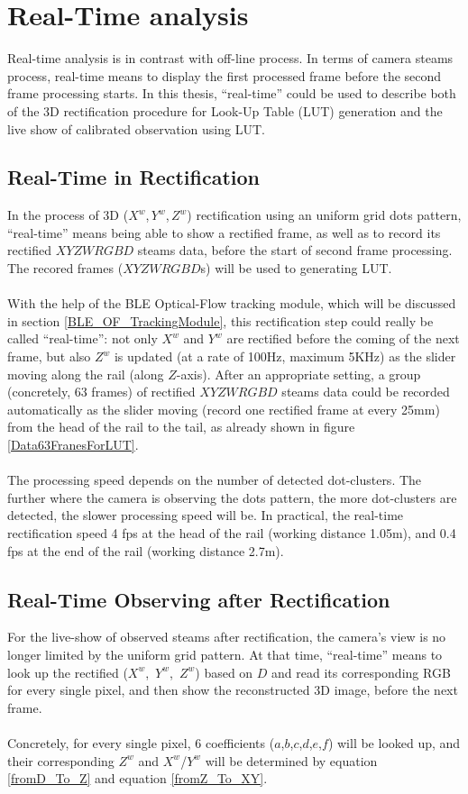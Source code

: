 \section{Real-Time analysis}
Real-time analysis is in contrast with off-line process. In terms of camera steams process, real-time means to display the first processed frame before the second frame processing starts. In this thesis, \enquote{real-time} could be used to describe both of the 3D rectification procedure for Look-Up Table (LUT) generation and the live show of calibrated observation using LUT.
\subsection{Real-Time in Rectification}
In the process of 3D (\(X^{w}\),\,\(Y^{w}\),\,\(Z^{w}\)) rectification using an uniform grid dots pattern, \enquote{real-time} means being able to show a rectified frame, as well as to record its rectified \(XYZWRGBD\) steams data, before the start of second frame processing. The recored frames (\(XYZWRGBD\)s) will be used to generating LUT.%
\\\\%
With the help of the BLE Optical-Flow tracking module, which will be discussed in section \ref{BLE_OF_TrackingModule}, this rectification step could really be called \enquote{real-time}: not only \(X^{w}\) and \(Y^{w}\) are rectified before the coming of the next frame, but also \(Z^{w}\) is updated (at a rate of 100Hz, maximum 5KHz) as the slider moving along the rail (along \(Z\)-axis). After an appropriate setting, a group (concretely, 63 frames) of rectified \(XYZWRGBD\) steams data could be recorded automatically as the slider moving (record one rectified frame at every 25mm) from the head of the rail to the tail, as already shown in figure \ref{Data63FranesForLUT}.%
\\\\%
The processing speed depends on the number of detected dot-clusters. The further where the camera is observing the dots pattern, the more dot-clusters are detected, the slower processing speed will be. In practical, the real-time rectification speed 4 fps at the head of the rail (working distance 1.05m), and 0.4 fps at the end of the rail (working distance 2.7m).
%
\subsection{Real-Time Observing after Rectification}
%
For the live-show of observed steams after rectification, the camera's view is no longer limited by the uniform grid pattern. At that time, \enquote{real-time} means to look up the rectified (\(X^{w}\),\, \(Y^{w}\),\, \(Z^{w}\)) based on \(D\) and read its corresponding RGB for every single pixel, and then show the reconstructed 3D image, before the next frame.%
\\\\%
Concretely, for every single pixel, 6 coefficients (\(a\),\(b\),\(c\),\(d\),\(e\),\(f\)) will be looked up, and their corresponding \(Z^{w}\) and \(X^{w}\)/\(Y^{w}\) will be determined by equation \ref{fromD_To_Z} and equation \ref{fromZ_To_XY}.
%
%
